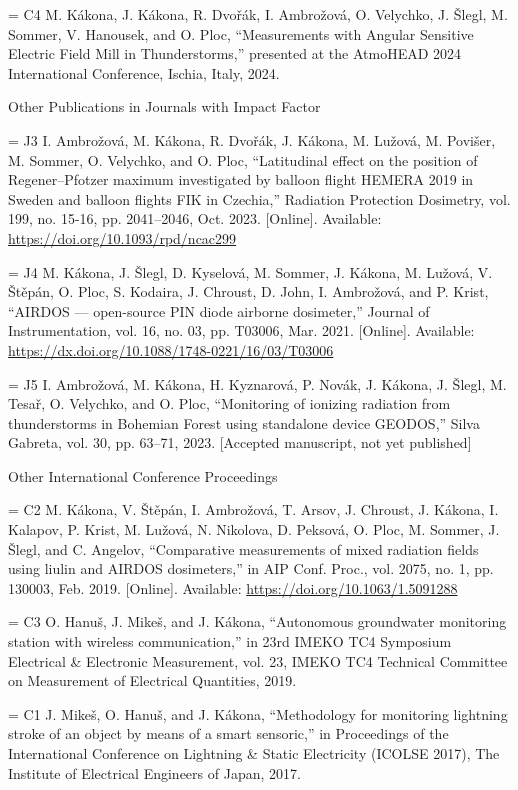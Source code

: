 \bib[c4] = {C4} M. Kákona, J. Kákona, R. Dvořák, I. Ambrožová, O. Velychko, J. Šlegl, M. Sommer, V. Hanousek, and O. Ploc, “Measurements with Angular Sensitive Electric Field Mill in Thunderstorms,” presented at the AtmoHEAD 2024 International Conference, Ischia, Italy, 2024.

\secc Other Publications in Journals with Impact Factor

\bib[j3] = {J3} I. Ambrožová, M. Kákona, R. Dvořák, J. Kákona, M. Lužová, M. Povišer, M. Sommer, O. Velychko, and O. Ploc, “Latitudinal effect on the position of Regener–Pfotzer maximum investigated by balloon flight HEMERA 2019 in Sweden and balloon flights FIK in Czechia,” Radiation Protection Dosimetry, vol. 199, no. 15-16, pp. 2041–2046, Oct. 2023. [Online]. Available: \url{https://doi.org/10.1093/rpd/ncac299}

\bib[j4] = {J4} M. Kákona, J. Šlegl, D. Kyselová, M. Sommer, J. Kákona, M. Lužová, V. Štěpán, O. Ploc, S. Kodaira, J. Chroust, D. John, I. Ambrožová, and P. Krist, “AIRDOS — open-source PIN diode airborne dosimeter,” Journal of Instrumentation, vol. 16, no. 03, pp. T03006, Mar. 2021. [Online]. Available: \url{https://dx.doi.org/10.1088/1748-0221/16/03/T03006}

\bib[j5] = {J5} I. Ambrožová, M. Kákona, H. Kyznarová, P. Novák, J. Kákona, J. Šlegl, M. Tesař, O. Velychko, and O. Ploc, “Monitoring of ionizing radiation from thunderstorms in Bohemian Forest using standalone device GEODOS,” Silva Gabreta, vol. 30, pp. 63–71, 2023. [Accepted manuscript, not yet published]

\secc Other International Conference Proceedings

\bib[c2] = {C2} M. Kákona, V. Štěpán, I. Ambrožová, T. Arsov, J. Chroust, J. Kákona, I. Kalapov, P. Krist, M. Lužová, N. Nikolova, D. Peksová, O. Ploc, M. Sommer, J. Šlegl, and C. Angelov, “Comparative measurements of mixed radiation fields using liulin and AIRDOS dosimeters,” in AIP Conf. Proc., vol. 2075, no. 1, pp. 130003, Feb. 2019. [Online]. Available: \url{https://doi.org/10.1063/1.5091288}

\bib[c3] = {C3} O. Hanuš, J. Mikeš, and J. Kákona, “Autonomous groundwater monitoring station with wireless communication,” in 23rd IMEKO TC4 Symposium Electrical \& Electronic Measurement, vol. 23, IMEKO TC4 Technical Committee on Measurement of Electrical Quantities, 2019.

\bib[c1] = {C1} J. Mikeš, O. Hanuš, and J. Kákona, “Methodology for monitoring lightning stroke of an object by means of a smart sensoric,” in Proceedings of the International Conference on Lightning \& Static Electricity (ICOLSE 2017), The Institute of Electrical Engineers of Japan, 2017.

